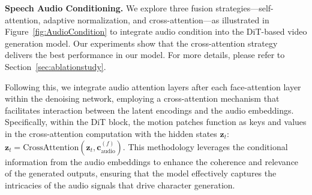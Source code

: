     


\noindent\textbf{Speech Audio Conditioning.}  
We explore three fusion strategies---self-attention, adaptive normalization, and cross-attention---as illustrated in Figure~\ref{fig:AudioCondition} to integrate audio condition into the DiT-based video generation model. Our experiments show that the cross-attention strategy delivers the best performance in our model. For more details, please refer to Section~\ref{sec:ablationstudy}. 

Following this, 
 we integrate audio attention layers after each face-attention layer within the denoising network, employing a cross-attention mechanism that facilitates interaction between the latent encodings and the audio embeddings. 
Specifically, within the DiT block, the motion patches function as keys and values in the cross-attention computation with the hidden states \(\mathbf{z}_t\): $\mathbf{z}_t = \text{CrossAttention}(\mathbf{z}_t, \mathbf{c}_{\text{audio}}^{(f)})$. This methodology leverages the conditional information from the audio embeddings to enhance the coherence and relevance of the generated outputs, ensuring that the model effectively captures the intricacies of the audio signals that drive character generation.  




